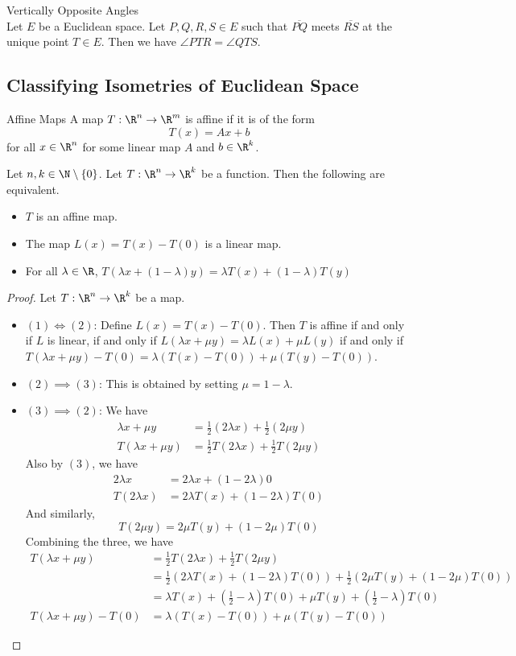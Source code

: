 \documentclass[a4paper]{article}
\begin{document}
\begin{prp}{Vertically Opposite Angles}{}\\
Let $E$ be a Euclidean space. Let $P,Q,R,S\in E$ such that $\overline{PQ}$ meets $\overline{RS}$ at the unique point $T\in E$. Then we have $\angle PTR=\angle QTS$. 
\end{prp}

\subsection{Classifying Isometries of Euclidean Space}
\begin{defn}{Affine Maps}{} A map $T:\R^n\to\R^m$ is affine if it is of the form $$T(x)=Ax+b$$ for all $x\in\R^n$ for some linear map $A$ and $b\in\R^k$. 
\end{defn}

\begin{prp}{}{} Let $n,k\in\N\setminus\{0\}$. Let $T:\R^n\to\R^k$ be a function. Then the following are equivalent. 
\begin{itemize}
\item $T$ is an affine map. 
\item The map $L(x)=T(x)-T(0)$ is a linear map. 
\item For all $\lambda\in\R$, $T(\lambda x+(1-\lambda)y)=\lambda T(x)+(1-\lambda)T(y)$
\end{itemize}
\begin{proof} Let $T:\R^n\to\R^k$ be a map. 
\begin{itemize}
\item $(1)\iff(2)$: Define $L(x)=T(x)-T(0)$. Then $T$ is affine if and only if $L$ is linear, if and only if $L(\lambda x+\mu y)=\lambda L(x)+\mu L(y)$ if and only if $T(\lambda x+\mu y)-T(0)=\lambda(T(x)-T(0))+\mu(T(y)-T(0))$. 
\item $(2)\implies (3)$: This is obtained by setting $\mu=1-\lambda$. 
\item $(3)\implies (2)$: We have
\begin{align*}
\lambda x+\mu y&=\frac{1}{2}(2\lambda x)+\frac{1}{2}(2\mu y)\\
T(\lambda x+\mu y)&=\frac{1}{2}T(2\lambda x)+\frac{1}{2}T(2\mu y)\tag{By (3)}
\end{align*}
Also by $(3)$, we have
\begin{align*}
2\lambda x&=2\lambda x+(1-2\lambda)0\\
T(2\lambda x)&=2\lambda T(x)+(1-2\lambda)T(0)
\end{align*}
And similarly, $$T(2\mu y)=2\mu T(y)+(1-2\mu)T(0)$$
Combining the three, we have 
\begin{align*}
T(\lambda x+\mu y)&=\frac{1}{2}T(2\lambda x)+\frac{1}{2}T(2\mu y)\\
&=\frac{1}{2}(2\lambda T(x)+(1-2\lambda)T(0))+\frac{1}{2}(2\mu T(y)+(1-2\mu)T(0))\\
&=\lambda T(x)+\left(\frac{1}{2}-\lambda\right)T(0)+\mu T(y)+\left(\frac{1}{2}-\lambda\right)T(0)\\
T(\lambda x+\mu y)-T(0)&=\lambda(T(x)-T(0))+\mu(T(y)-T(0))
\end{align*}
\end{itemize}
\end{proof}
\end{prp}
\end{document}
